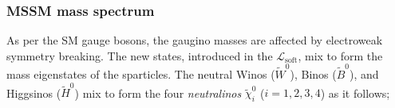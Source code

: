 




			\subsubsection*{MSSM mass spectrum}

				As per the \ac{SM} gauge bosons, the gaugino masses are affected by electroweak symmetry breaking. The new states, introduced in the $\mathcal L_{\mathrm{soft}}$, mix to form the mass eigenstates of the sparticles. The neutral Winos ($\tilde{W}^0$), Binos ($\tilde{B}^0$), and Higgsinos ($\tilde{H}^0$) mix to form the four \textit{neutralinos} $\tilde{\chi}^0_i$ ($i=1,2,3,4$) as it follows; 


